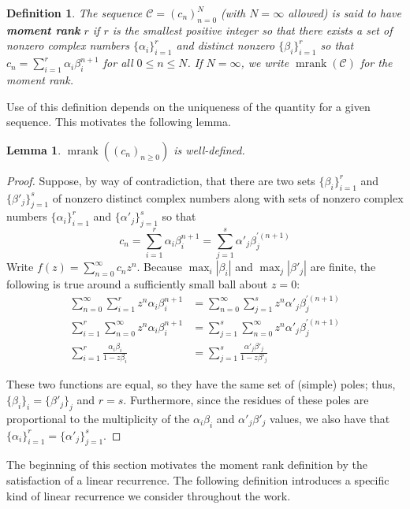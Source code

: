 \documentclass[12pt,reqno]{article}
\newtheorem{lemma}{Lemma}
\newtheorem{definition}{Definition}
\DeclareMathOperator{\mrank}{mrank}
\begin{document}
\begin{definition}\label{Def:mrank}
The sequence $\mathcal{C} = (c_n)_{n=0}^N$ (with $N = \infty$ allowed) is said to have \textbf{moment rank} $r$ if $r$ is the smallest positive integer so that there exists a set of nonzero complex numbers $\{\alpha_i\}_{i=1}^r$ and distinct nonzero $\{\beta_i\}_{i=1}^r$ so that $c_n=\sum_{i=1}^r \alpha_i \beta_i^{n+1}$ for all $0 \leq n \leq N$. If $N = \infty$, we write $\mrank(\mathcal{C})$ for the moment rank.
\end{definition}

Use of this definition depends on the uniqueness of the quantity for a given sequence. This motivates the following lemma. 

\begin{lemma} \label{lem:GDCisMeaningful}
$\mrank((c_n)_{n \geq 0})$ is well-defined.
\end{lemma}
\begin{proof}
Suppose, by way of contradiction, that there are two sets $\{\beta_i\}_{i=1}^r$ and $\{\beta'_j\}_{j=1}^s$ of nonzero distinct complex numbers along with sets of nonzero complex numbers $\{\alpha_i\}_{i=1}^r$ and $\{\alpha'_j\}_{j=1}^s$ so that  
$$
c_n=\sum_{i=1}^r\alpha_i \beta_i^{n+1}=\sum_{j=1}^s\alpha'_j \beta_j^{\prime(n+1)}
$$ 
Write $f(z)=\sum_{n=0}^\infty c_n z^n$. Because $\max_i|\beta_i|$ and $\max_j|\beta'_j|$ are finite, the following is true around a sufficiently small ball about $z=0$: 
\begin{align*} 
\sum_{n=0}^\infty \sum_{i=1}^r z^n\alpha_i \beta_i^{n+1} &= \sum_{n=0}^\infty \sum_{j=1}^s z^n \alpha'_j \beta_j^{\prime (n+1)} \\
\sum_{i=1}^r \sum_{n=0}^\infty z^n\alpha_i \beta_i^{n+1} &= \sum_{j=1}^s \sum_{n=0}^\infty z^n \alpha'_j \beta_j^{\prime (n+1)} \\
\sum_{i=1}^r \frac{\alpha_i \beta_i}{1-z\beta_i} &= \sum_{j=1}^s \frac{\alpha'_j \beta'_j}{1-z\beta'_j}
\end{align*}

These two functions are equal, so they have the same set of (simple) poles; thus, $\{\beta_i\}_i = \{\beta'_j\}_j$ and $r=s$.  Furthermore, since the residues of these poles are proportional to the multiplicity of the $\alpha_i \beta_i$ and $\alpha'_j \beta'_j$ values, we also have that $\{\alpha_i\}_{i =1}^r = \{\alpha'_j\}_{j =1}^s$.
\end{proof}

The beginning of this section motivates the moment rank definition by the satisfaction of a linear recurrence. The following definition introduces a specific kind of linear recurrence we consider throughout the work. 
\end{document}
